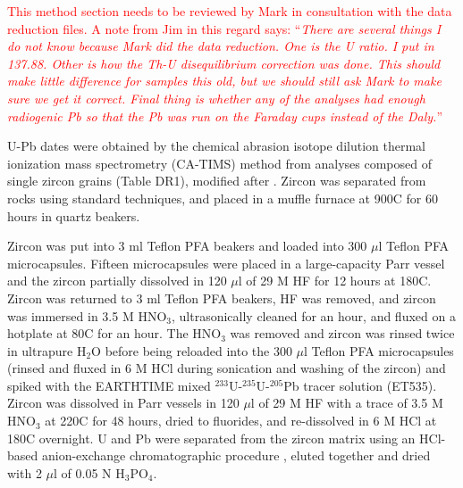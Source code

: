 \documentclass[11pt,letterpaper]{article}
\begin{document}
{\footnotesize\textcolor{red}{This method section needs to be reviewed by Mark in consultation with the data reduction files. A note from Jim in this regard says: ``\textit{There are several things I do not know because Mark did the data reduction. One is the U ratio. I put in 137.88. Other is how the Th-U disequilibrium correction was done. This should make little difference for samples this old, but we should still ask Mark to make sure we get it correct. Final thing is whether any of the analyses had enough radiogenic Pb so that the Pb was run on the Faraday cups instead of the Daly.}''}}

U-Pb dates were obtained by the chemical abrasion isotope dilution thermal ionization mass spectrometry (CA-TIMS) method from analyses composed of single zircon grains (Table DR1), modified after \cite{Mattinson2005a}. Zircon was separated from rocks using standard techniques, and placed in a muffle furnace at 900\textdegree C for 60 hours in quartz beakers.

Zircon was put into 3 ml Teflon PFA beakers and loaded into 300 $\mu$l Teflon PFA microcapsules. Fifteen microcapsules were placed in a large-capacity Parr vessel and the zircon partially dissolved in 120 $\mu$l of 29 M HF for 12 hours at 180\textdegree C. Zircon was returned to 3 ml Teflon PFA beakers, HF was removed, and zircon was immersed in 3.5 M HNO$_\mathrm{3}$, ultrasonically cleaned for an hour, and fluxed on a hotplate at 80\textdegree C for an hour. The HNO$_\mathrm{3}$ was removed and zircon was rinsed twice in ultrapure H$_\mathrm{2}$O before being reloaded into the 300 $\mu$l Teflon PFA microcapsules (rinsed and fluxed in 6 M HCl during sonication and washing of the zircon) and spiked with the EARTHTIME mixed $^{233}$U-$^{235}$U-$^{205}$Pb tracer solution (ET535). Zircon was dissolved in Parr vessels in 120 $\mu$l of 29 M HF with a trace of 3.5 M HNO$_\mathrm{3}$ at 220\textdegree C for 48 hours, dried to fluorides, and re-dissolved in 6 M HCl at 180\textdegree C overnight. U and Pb were separated from the zircon matrix using an HCl-based anion-exchange chromatographic procedure \citep{Krogh1973a}, eluted together and dried with 2 $\mu$l of 0.05 N H$_\mathrm{3}$PO$_\mathrm{4}$.
\end{document}
